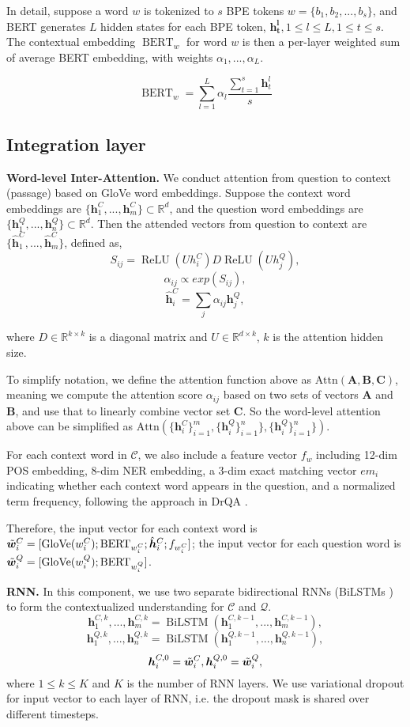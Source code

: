 \documentclass{article} \usepackage{sdnet,times}
\newcommand{\B}[1] {\boldsymbol{#1}}
\def\bA{{\B{A}}}
\def\bB{{\B{B}}}
\def\bC{{\B{C}}}
\def\bh{{\B{h}}}
\def\bw{{\B{w}}}
\DeclareMathOperator*{\relu}{ReLU}
\DeclareMathOperator{\BiLSTM}{\mbox{BiLSTM}}
\DeclareMathOperator{\bert}{\mbox{BERT}}
\DeclareMathOperator{\glove}{GloVe}
\begin{document}
In detail, suppose a word $w$ is tokenized to $s$ BPE tokens $w=\{b_1, b_2, ..., b_s\}$, and BERT generates $L$ hidden states for each BPE token, $\mathbf{h^l_t}, 1\leq l \leq L, 1\leq t \leq s$. The contextual embedding $\bert_w$ for word $w$ is then a per-layer weighted sum of average BERT embedding, with weights $\alpha_1, ..., \alpha_L$.

$$\bert_w = \sum_{l=1}^L \alpha_l \frac{\sum_{t=1}^s \mathbf{h}^l_t}{s}
$$

\subsection{Integration layer}
\textbf{Word-level Inter-Attention.} We conduct attention from question to context (passage) based on GloVe word embeddings. Suppose the context word embeddings are $\{\bh^C_1, ..., \bh^C_m\}\subset \mathbb{R}^d$, and the question word embeddings are $\{\bh^Q_1, ..., \bh^Q_n\}\subset \mathbb{R}^d$. Then the attended vectors from question to context are $\{\hat{\bh}^C_1, ..., \hat{\bh}^C_m\}$, defined as,
$$S_{ij} = \relu(Uh^C_i)D\relu(Uh^Q_j),$$ 
$$\alpha_{ij} \propto  {exp(S_{ij})},$$
$$\hat{\bh}^C_i = \sum_j \alpha_{ij}\bh^Q_j,$$

where $D\in \mathbb{R}^{k\times k}$ is a diagonal matrix and $U\in \mathbb{R}^{d\times k}$, $k$ is the attention hidden size. 

To simplify notation, we define the attention function above as $\mbox{Attn}(\bA, \bB, \bC)$, meaning we compute the attention score $\alpha_{ij}$ based on two sets of vectors $\bA$ and $\bB$, and use that to linearly combine vector set $\bC$. So the word-level attention above can be simplified as $\mbox{Attn}(\{\bh^C_i\}_{i=1}^m, \{\bh^Q_i\}_{i=1}^n\}, \{\bh^Q_i\}_{i=1}^n\})$.

For each context word in $\mathcal{C}$, we also include a feature vector $f_w$ including 12-dim POS embedding, 8-dim NER embedding, a 3-dim exact matching vector $em_i$ indicating whether each context word appears in the question, and a normalized term frequency, following the approach in DrQA \citep{drqa}.

Therefore, the input vector for each context word is $\Tilde{\bw}_i^C=[\glove(w_i^C); \bert_{w_i^C}; \hat{\bh}^C_i; f_{w_i^C}]$; the input vector for each question word is $\Tilde{\bw}_i^Q=[\glove(w_i^Q); \bert_{w_i^Q}]$.

\textbf{RNN.} In this component, we use two separate bidirectional RNNs (BiLSTMs \citep{lstm}) to form the contextualized understanding for $\mathcal{C}$ and $\mathcal{Q}$.
$$
\bh_1^{C,k}, ..., \bh_m^{C,k} = \BiLSTM{(\bh_1^{C,k-1}, ..., \bh_m^{C,k-1})},
$$
$$
\bh_1^{Q,k}, ..., \bh_n^{Q,k} = \BiLSTM{(\bh_1^{Q,k-1}, ..., \bh_n^{Q,k-1})},
$$
$$
\bh_i^{C,0} = \Tilde{\bw}_i^C, \bh_i^{Q,0} = \Tilde{\bw}_i^Q,
$$
where $1\leq k \leq K$ and $K$ is the number of RNN layers. We use variational dropout \citep{vd} for input vector to each layer of RNN, i.e. the dropout mask is shared over different timesteps.
\end{document}
